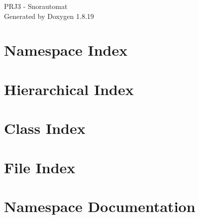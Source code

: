 \let\mypdfximage\pdfximage\def\pdfximage{\immediate\mypdfximage}\documentclass[twoside]{book}
\newcommand{\+}{\discretionary{\mbox{\scriptsize$\hookleftarrow$}}{}{}}
\newcommand{\clearemptydoublepage}{%
  \newpage{\pagestyle{empty}\cleardoublepage}%
}
\begin{document}
\hypersetup{pageanchor=false,
             bookmarksnumbered=true,
             pdfencoding=unicode
            }
\begin{titlepage}
\vspace*{7cm}
\begin{center}%
{\Large P\+R\+J3 -\/ Snorautomat }\\
\vspace*{1cm}
{\large Generated by Doxygen 1.8.19}\\
\end{center}
\end{titlepage}
\clearemptydoublepage
{}
\tableofcontents
\clearemptydoublepage
{}
\hypersetup{pageanchor=true}

\chapter{Namespace Index}

\chapter{Hierarchical Index}

\chapter{Class Index}

\chapter{File Index}

\chapter{Namespace Documentation}




\end{document}
